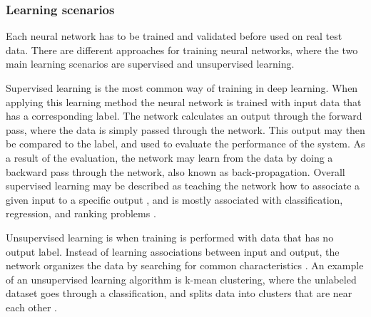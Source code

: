 


\subsubsection{Learning scenarios}
Each neural network has to be trained and validated before used on real test data. There are different approaches for training neural networks, where the two main learning scenarios are supervised and unsupervised learning. 

\noindent
Supervised learning is the most common way of training in deep learning. When applying this learning method the neural network is trained with input data that has a corresponding label. The network calculates an output through the forward pass, where the data is simply passed through the network. This output may then be compared to the label, and used to evaluate the performance of the system. As a result of the evaluation, the network may learn from the data by doing a backward pass through the network, also known as back-propagation.\citep{LeCun2015} Overall supervised learning may be described as teaching the network how to associate a given input to a specific output \citep{Goodfellow2016}, and is mostly associated with classification, regression, and ranking problems \citep{Mehryar2012}. 

\noindent
Unsupervised learning is when training is performed with data that has no output label. Instead of learning associations between input and output, the network organizes the data by searching for common characteristics \citep{Mehryar2012}. An example of an unsupervised learning algorithm is k-mean clustering, where the unlabeled dataset goes through a classification, and splits data into clusters that are near each other \citep{Goodfellow2016}.  


